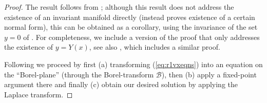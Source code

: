 \documentclass[reqno,12pt]{amsart}
\newcommand{\eqlab}[1]{\label{eq:#1}}
\renewcommand{\eqref}[1]{(\ref{eq:#1})}
\numberwithin{equation}{section}
\begin{document}
 \begin{proof}
  The result follows from \cite[Theorem 3]{bonckaert2008a}; although this result does not address the existence of an invariant manifold directly (instead \cite{bonckaert2008a} proves existence of a certain normal form), this can be obtained as a corollary, using the invariance of the set $y=0$ of \cite[Eq. (8)]{bonckaert2008a}. For completeness, we include a version of the proof that only addresses the existence of $y=Y(x)$, see also \cite[App. A]{kriszm1}, which includes a similar proof.
  
  Following
  \cite{bonckaert2008a} we proceed by first (a) transforming \eqref{r1vxeqns} into an equation on the ``Borel-plane'' (through the Borel-transform $\mathcal B$), then (b) apply a fixed-point argument there and finally (c) obtain our desired solution by applying the Laplace transform. 


\end{proof}
\end{document}
